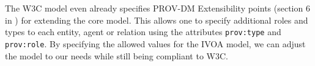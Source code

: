The W3C model even already specifies PROV-DM Extensibility points (section 6 in \citealt{std:W3CProvDM}) for extending the core model. This allows one to specify additional roles and types to each entity, agent or relation using the attributes \texttt{prov:type} and \texttt{prov:role}.
By specifying the allowed values for the IVOA model, we can adjust the model to our needs while still being compliant to W3C.


